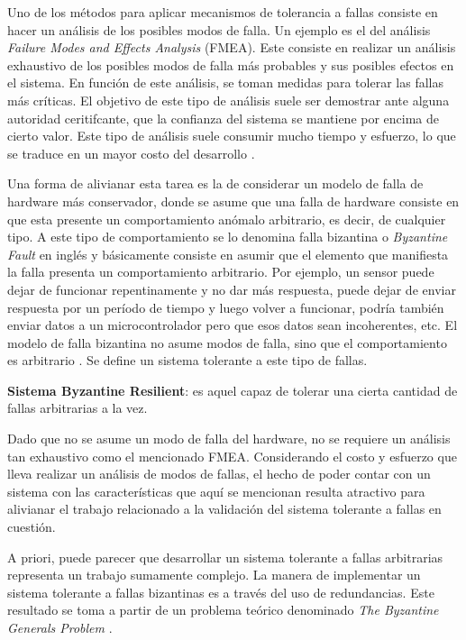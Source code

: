 Uno de los métodos para aplicar mecanismos de tolerancia a fallas consiste en hacer un análisis de los posibles modos de falla. Un ejemplo es el del análisis \textit{Failure Modes and Effects Analysis} (FMEA). Este consiste en realizar un análisis exhaustivo de los posibles modos de falla más probables y sus posibles efectos en el sistema. En función de este análisis, se toman medidas para tolerar las fallas más críticas. El objetivo de este tipo de análisis suele ser demostrar ante alguna autoridad ceritifcante, que la confianza del sistema se mantiene por encima de cierto valor. Este tipo de análisis suele consumir mucho tiempo y esfuerzo, lo que se traduce en un mayor costo del desarrollo \cite{lala1994architectural}.

Una forma de alivianar esta tarea es la de considerar un modelo de falla de hardware más conservador, donde se asume que una falla de hardware consiste en que esta presente un comportamiento anómalo arbitrario, es decir, de cualquier tipo. A este tipo de comportamiento se lo denomina falla bizantina o \textit{Byzantine Fault} en inglés y básicamente consiste en asumir que el elemento que manifiesta la falla presenta un comportamiento arbitrario. Por ejemplo, un sensor puede dejar de funcionar repentinamente y no dar más respuesta, puede dejar de enviar respuesta por un período de tiempo y luego volver a funcionar, podría también enviar datos a un microcontrolador pero que esos datos sean incoherentes, etc. El modelo de falla bizantina no asume modos de falla, sino que el comportamiento es arbitrario \cite{roth2021not}\cite{hiergeist2017internal}\cite{lala1994architectural}. Se define un sistema tolerante a este tipo de fallas.

\begin{mydef}
    \textbf{Sistema Byzantine Resilient}: es aquel capaz de tolerar una cierta cantidad de fallas arbitrarias a la vez.
\end{mydef}

Dado que no se asume un modo de falla del hardware, no se requiere un análisis tan exhaustivo como el mencionado FMEA. Considerando el costo y esfuerzo que lleva realizar un análisis de modos de fallas, el hecho de poder contar con un sistema con las características que aquí se mencionan resulta atractivo para alivianar el trabajo relacionado a la validación del sistema tolerante a fallas en cuestión.

A priori, puede parecer que desarrollar un sistema tolerante a fallas arbitrarias representa un trabajo sumamente complejo. La manera de implementar un sistema tolerante a fallas bizantinas es a través del uso de redundancias. Este resultado se toma a partir de un problema teórico denominado \textit{The Byzantine Generals Problem} \cite{lamport2019byzantine}.

